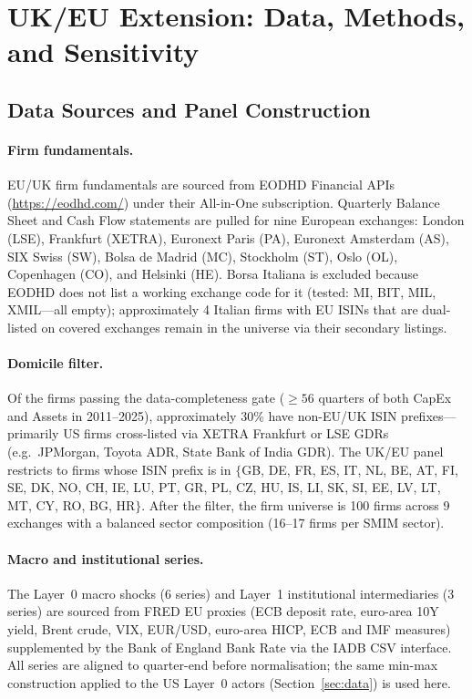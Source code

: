 \documentclass[11pt,a4paper]{article}
\begin{document}
\section{UK/EU Extension: Data, Methods, and Sensitivity}
\label{app:uk_eu}

\subsection{Data Sources and Panel Construction}

\paragraph{Firm fundamentals.} EU/UK firm fundamentals are sourced from EODHD Financial APIs (\url{https://eodhd.com/}) under their All-in-One subscription. Quarterly Balance Sheet and Cash Flow statements are pulled for nine European exchanges: London (LSE), Frankfurt (XETRA), Euronext Paris (PA), Euronext Amsterdam (AS), SIX Swiss (SW), Bolsa de Madrid (MC), Stockholm (ST), Oslo (OL), Copenhagen (CO), and Helsinki (HE). Borsa Italiana is excluded because EODHD does not list a working exchange code for it (tested: MI, BIT, MIL, XMIL---all empty); approximately 4 Italian firms with EU ISINs that are dual-listed on covered exchanges remain in the universe via their secondary listings.

\paragraph{Domicile filter.} Of the firms passing the data-completeness gate ($\geq 56$ quarters of both CapEx and Assets in 2011--2025), approximately 30\% have non-EU/UK ISIN prefixes---primarily US firms cross-listed via XETRA Frankfurt or LSE GDRs (e.g.\ JPMorgan, Toyota ADR, State Bank of India GDR). The UK/EU panel restricts to firms whose ISIN prefix is in $\{$GB, DE, FR, ES, IT, NL, BE, AT, FI, SE, DK, NO, CH, IE, LU, PT, GR, PL, CZ, HU, IS, LI, SK, SI, EE, LV, LT, MT, CY, RO, BG, HR$\}$. After the filter, the firm universe is 100 firms across 9 exchanges with a balanced sector composition (16--17 firms per SMIM sector).

\paragraph{Macro and institutional series.} The Layer~0 macro shocks (6 series) and Layer~1 institutional intermediaries (3 series) are sourced from FRED EU proxies (ECB deposit rate, euro-area 10Y yield, Brent crude, VIX, EUR/USD, euro-area HICP, ECB and IMF measures) supplemented by the Bank of England Bank Rate via the IADB CSV interface. All series are aligned to quarter-end before normalisation; the same min-max construction applied to the US Layer~0 actors (Section~\ref{sec:data}) is used here.
\end{document}
